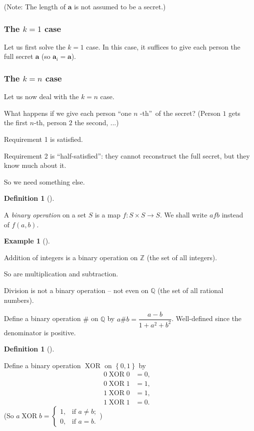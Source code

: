 \documentclass[numbers=enddot,12pt,final,onecolumn,notitlepage]{scrartcl}%
\numberwithin{exer}{section}
\theoremstyle{definition}
\newtheorem{defi}[theo]{Definition}
\newenvironment{definition}[1][]
{\begin{defi}[#1]\begin{leftbar}}
{\end{leftbar}\end{defi}}
\newtheorem{exam}[theo]{Example}
\newenvironment{example}[1][]
{\begin{exam}[#1]\begin{leftbar}}
{\end{leftbar}\end{exam}}
\begin{document}
(Note: The length of $\mathbf{a}$ is not assumed to be a secret.)

\subsubsection{The $k=1$ case}

Let us first solve the $k=1$ case. In this case, it suffices to give each
person the full secret $\mathbf{a}$ (so $\mathbf{a}_{i}=\mathbf{a}$).

\subsubsection{The $k=n$ case}

Let us now deal with the $k=n$ case.

What happens if we give each person \textquotedblleft one $n$%
-th\textquotedblright\ of the secret? (Person $1$ gets the first $n$-th,
person $2$ the second, ...)

Requirement 1 is satisfied.

Requirement 2 is \textquotedblleft half-satisfied\textquotedblright: they
cannot reconstruct the full secret, but they know much about it.

So we need something else.

\begin{definition}
A \textit{binary operation} on a set $S$ is a map $f:S\times S\rightarrow S$.
We shall write $afb$ instead of $f\left(  a,b\right)  $.
\end{definition}

\begin{example}
Addition of integers is a binary operation on $\mathbb{Z}$ (the set of all integers).

So are multiplication and subtraction.

Division is not a binary operation -- not even on $\mathbb{Q}$ (the set of all
rational numbers).

Define a binary operation $\#$ on $\mathbb{Q}$ by $a\#b=\dfrac{a-b}%
{1+a^{2}+b^{2}}$. Well-defined since the denominator is positive.
\end{example}

\begin{definition}
Define a binary operation $\operatorname*{XOR}$ on $\left\{  0,1\right\}  $ by%
\begin{align*}
0\operatorname*{XOR}0  & =0,\\
0\operatorname*{XOR}1  & =1,\\
1\operatorname*{XOR}0  & =1,\\
1\operatorname*{XOR}1  & =0.
\end{align*}
(So $a\operatorname*{XOR}b=%
\begin{cases}
1, & \text{if }a\neq b;\\
0, & \text{if }a=b.
\end{cases}
$)
\end{definition}
\end{document}
